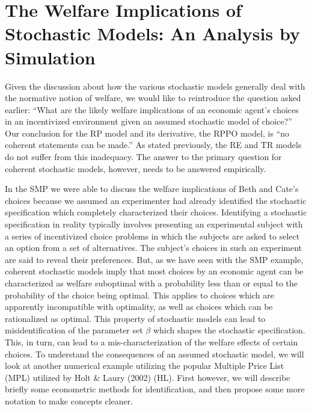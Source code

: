\documentclass[../main.tex]{subfiles}
\begin{document}
\onehalfspacing
\setcounter{chapter}{2}

\chapter{The Welfare Implications of Stochastic Models: An Analysis by Simulation}

\lltoc %

Given the discussion about how the various stochastic models generally deal with the normative notion of welfare, we would like to reintroduce the question asked earlier: 
\enquote{What are the likely welfare implications of an economic agent's choices in an incentivized environment given an assumed stochastic model of choice?}
Our conclusion for the RP model and its derivative, the RPPO model, is \enquote{no coherent statements can be made.}
As stated previously, the RE and TR models do not suffer from this inadequacy. 
The answer to the primary question for coherent stochastic models, however, needs to be answered empirically.

In the SMP we were able to discuss the welfare implications of Beth and Cate's choices because we assumed an experimenter had already identified the stochastic specification which completely characterized their choices.
Identifying a stochastic specification in reality typically involves presenting an experimental subject with a series of incentivized choice problems in which the subjects are asked to select an option from a set of alternatives.
The subject's choices in such an experiment are said to reveal their preferences.
But, as we have seen with the SMP example, coherent stochastic models imply that most choices by an economic agent can be characterized as welfare suboptimal with a probability less than or equal to the probability of the choice being optimal.
This applies to choices which are apparently incompatible with optimality, as well as choices which can be rationalized as optimal.
This property of stochastic models can lead to misidentification of the parameter set $\beta$ which shapes the stochastic specification.
This, in turn, can lead to a mis-characterization of the welfare effects of certain choices.
To understand the consequences of an assumed stochastic model, we will look at another numerical example utilizing the popular Multiple Price List (MPL) utilized by Holt \& Laury (2002) (HL).
First however, we will describe briefly some econometric methods for identification, and then propose some more notation to make concepts cleaner.
\end{document}
